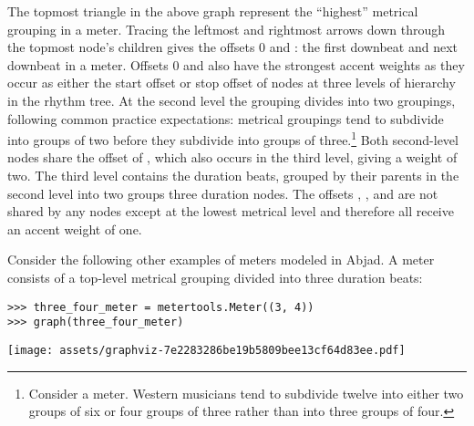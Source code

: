 The topmost triangle in the above graph represent the \enquote{highest}
metrical grouping in a  meter. Tracing the leftmost and rightmost
arrows down through the topmost node's children gives the offsets 0 and
: the first downbeat and next downbeat in a  meter.
Offsets 0 and  also have the strongest accent weights as they occur
as either the start offset or stop offset of nodes at three levels of hierarchy
in the rhythm tree. At the second level the  grouping divides into
two  groupings, following common practice expectations: metrical
groupings tend to subdivide into groups of two before they subdivide into
groups of three.\footnote{Consider a  meter. Western musicians
tend to subdivide twelve into either two groups of six or four groups of three
rather than into three groups of four.} Both second-level nodes share the
offset of , which also occurs in the third level, giving
 a weight of two. The third level contains the 
duration beats, grouped by their parents in the second level into two groups
three  duration nodes. The offsets , ,
 and  are not shared by any nodes except at the lowest
metrical level and therefore all receive an accent weight of one.

Consider the following other examples of meters modeled in Abjad. A
 meter consists of a top-level  metrical grouping
divided into three  duration beats:

\begin{comment}
<abjad>
three_four_meter = metertools.Meter((3, 4))
graph(three_four_meter)
</abjad>
\end{comment}

\begin{abjadbookoutput}
\begin{singlespacing}
\vspace{-0.5\baselineskip}
\begin{verbatim}
>>> three_four_meter = metertools.Meter((3, 4))
>>> graph(three_four_meter)
\end{verbatim}
\noindent\texttt{[image: assets/graphviz-7e2283286be19b5809bee13cf64d83ee.pdf]}
\end{singlespacing}
\end{abjadbookoutput}

